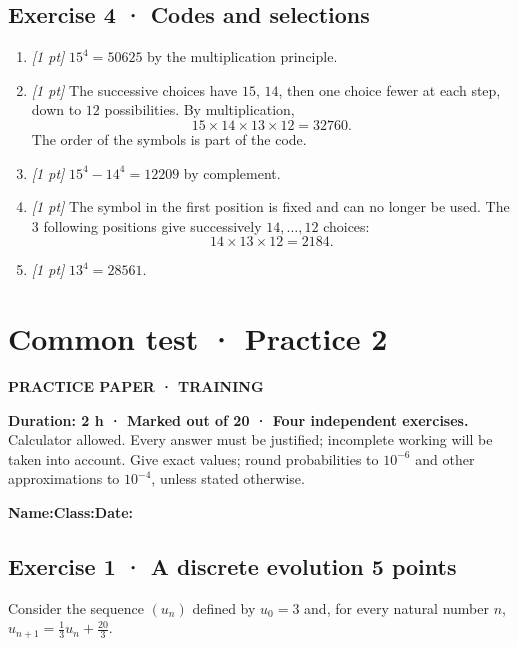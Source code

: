 \subsection*{Exercise 4 · Codes and selections}\begin{enumerate}

\item \textit{[1 pt]} $15^4=50625$ by the multiplication principle.

\item \textit{[1 pt]} The successive choices have $15$, $14$, then one choice fewer at each step, down to $12$ possibilities. By multiplication,
\[15\times14\times13\times12=32760.\]
The order of the symbols is part of the code.

\item \textit{[1 pt]} $15^4-14^4=12209$ by complement.

\item \textit{[1 pt]} The symbol in the first position is fixed and can no longer be used. The $3$ following positions give successively $14,\ldots,12$ choices:
\[14\times13\times12=2184.\]

\item \textit{[1 pt]} $13^4=28561$.

\end{enumerate}

\fi

\clearpage{}\label{sujet:3-2}

\section*{Common test · Practice 2}

{\sffamily\bfseries\color{teal}PRACTICE PAPER · TRAINING\par}

\textbf{Duration: 2 h · Marked out of 20 · Four independent exercises.}\\Calculator allowed. Every answer must be justified; incomplete working will be taken into account. Give exact values; round probabilities to $10^{-6}$ and other approximations to $10^{-4}$, unless stated otherwise.

\smallskip\textbf{Name:}\enspace\dotfill\quad\textbf{Class:}\enspace\dotfill\quad\textbf{Date:}\enspace\dotfill

\subsection*{Exercise 1 · A discrete evolution \hfill 5 points}Consider the sequence $(u_n)$ defined by $u_0=3$ and, for every natural number $n$, $u_{n+1}=\frac{1}{3}u_n+\frac{20}{3}$.

